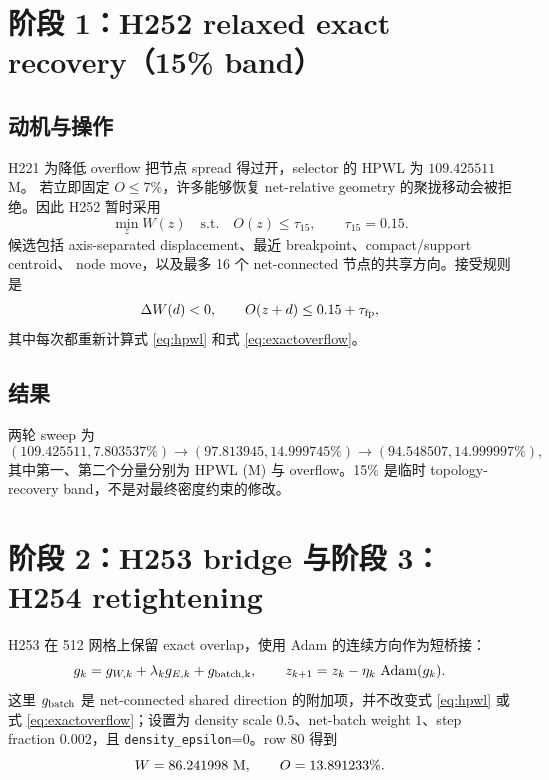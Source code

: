 \documentclass[UTF8,11pt,a4paper]{ctexart}
\begin{document}
\section{阶段 1：H252 relaxed exact recovery（15\% band）}

\subsection{动机与操作}
H221 为降低 overflow 把节点 spread 得过开，selector 的 HPWL 为 $109.425511$ M。
若立即固定 $O\le7\%$，许多能够恢复 net-relative geometry 的聚拢移动会被拒绝。因此
H252 暂时采用
\begin{equation}
 \min_z W(z)\quad\text{s.t.}\quad O(z)\le\tau_{15},
 \qquad \tau_{15}=0.15.
 \label{eq:cap15}
\end{equation}
候选包括 axis-separated displacement、最近 breakpoint、compact/support centroid、
node move，以及最多 16 个 net-connected 节点的共享方向。接受规则是
\begin{equation}
 \Delta W(d)<0,\qquad O(z+d)\le0.15+\tau_{\rm fp},
 \label{eq:h252accept}
\end{equation}
其中每次都重新计算式 \eqref{eq:hpwl} 和式 \eqref{eq:exactoverflow}。

\subsection{结果}
两轮 sweep 为
\begin{equation}
 (109.425511,7.803537\%)
 \rightarrow(97.813945,14.999745\%)
 \rightarrow(94.548507,14.999997\%),
 \label{eq:h252result}
\end{equation}
其中第一、第二个分量分别为 HPWL (M) 与 overflow。15\% 是临时 topology-recovery
band，不是对最终密度约束的修改。

\section{阶段 2：H253 bridge 与阶段 3：H254 retightening}

H253 在 512 网格上保留 exact overlap，使用 Adam 的连续方向作为短桥接：
\begin{equation}
 g_k=g_{W,k}+\lambda_k g_{E,k}+g_{\rm batch,k},
 \qquad
 z_{k+1}=z_k-\eta_k\,\operatorname{Adam}(g_k).
 \label{eq:bridge}
\end{equation}
这里 $g_{\rm batch}$ 是 net-connected shared direction 的附加项，并不改变式
\eqref{eq:hpwl} 或式 \eqref{eq:exactoverflow}；设置为 density scale $0.5$、net-batch
weight $1$、step fraction $0.002$，且 \texttt{density\_epsilon}=0。row 80 得到
\[
 W=86.241998\ {\rm M},\qquad O=13.891233\%.
\]
\end{document}

